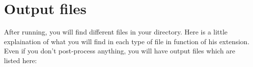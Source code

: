\section{Output files} \label{post}
After running, you will find different files in your directory. Here is a little explaination of what you will find in each type of file in function of his extension.\\



Even if you don't post-process anything, you will have output files which are listed here:

